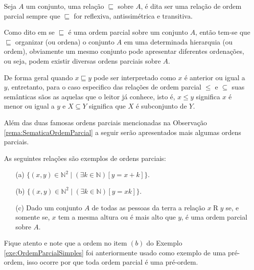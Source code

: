 \begin{definicao}\label{def:OrdemParcial}
	Seja $A$ um conjunto, uma relação $\sqsubseteq$ sobre $A$, é dita ser uma relação de ordem parcial sempre que $\sqsubseteq$ for reflexiva, antissimétrica e transitiva.
\end{definicao}

Como dito em \cite{abe1991-TC} se $\sqsubseteq$ é uma ordem parcial sobre um conjunto $A$, então tem-se que $\sqsubseteq$ organizar (ou ordena) o conjunto $A$ em uma determinada hierarquia (ou ordem), obviamente um mesmo conjunto pode apresentar diferentes ordenações, ou seja, podem existir diversas ordens parciais sobre $A$.

\begin{nota}\label{rema:SematicaOrdemParcial}
	De forma geral quando $x \sqsubseteq y$ pode ser interpretado como $x$ é anterior ou igual a $y$, entretanto, para o caso especifico das relações de ordem parcial $\leq$ e $\subseteq$ suas semânticas sãos as aquelas que o leitor já conhece, isto é, $x \leq y$ significa $x$ é menor ou igual a $y$ e $X \subseteq Y$ significa que $X$ é subconjunto de $Y$.
\end{nota}

Além das duas famosas ordens parciais mencionadas na Observação \ref{rema:SematicaOrdemParcial} a seguir serão apresentados mais algumas ordens parciais.

\begin{exemplo}\label{exe:OrdemParcialSimples}
	As seguintes relações são exemplos de ordens parciais:
	\begin{itemize}
		\item[(a)] $\{(x, y) \in \mathbb{N}^2 \mid (\exists k \in \mathbb{N})[y = x + k]\}$.
		\item[(b)] $\{(x, y) \in \mathbb{N}^2 \mid (\exists k \in \mathbb{N})[y = xk]\}$.
		\item[(c)] Dado um conjunto $A$ de todas as pessoas da terra a relação $x \mathrel{R} y$ se, e somente se, $x$ tem a mesma altura ou é mais alto que $y$, é uma ordem parcial sobre $A$.
	\end{itemize}
\end{exemplo}

\begin{nota}
  Fique atento e note que a ordem no item $(b)$ do Exemplo \ref{exe:OrdemParcialSimples} foi anteriormente usado como exemplo de uma pré-ordem, isso ocorre por que toda ordem parcial é uma pré-ordem.
\end{nota}

